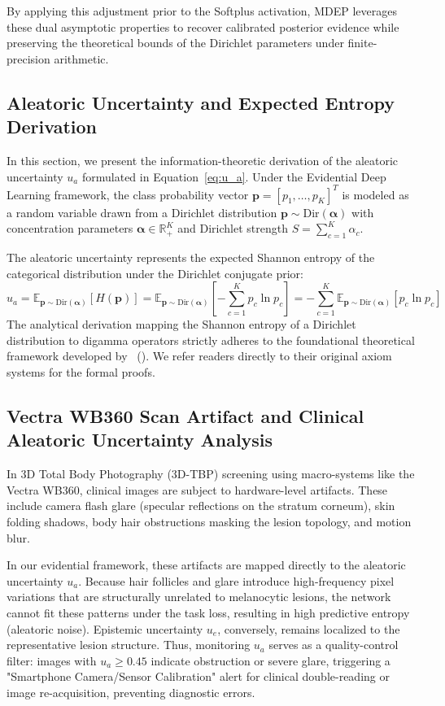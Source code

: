 \documentclass[letterpaper]{article} %
\begin{document}
By applying this adjustment prior to the Softplus activation, MDEP leverages these dual asymptotic properties to recover calibrated posterior evidence while preserving the theoretical bounds of the Dirichlet parameters under finite-precision arithmetic.

\subsection{Aleatoric Uncertainty and Expected Entropy Derivation}\label{subsec:aleatoric}
In this section, we present the information-theoretic derivation of the aleatoric uncertainty $u_a$ formulated in Equation~\ref{eq:u_a}. Under the Evidential Deep Learning framework, the class probability vector $\bm{p} = [p_1, \ldots, p_K]^T$ is modeled as a random variable drawn from a Dirichlet distribution $\bm{p} \sim \text{Dir}(\bm{\alpha})$ with concentration parameters $\bm{\alpha} \in \mathbb{R}_+^K$ and Dirichlet strength $S = \sum_{c=1}^K \alpha_c$.

The aleatoric uncertainty represents the expected Shannon entropy of the categorical distribution under the Dirichlet conjugate prior:
\begin{equation}
    u_a = \mathbb{E}_{\bm{p} \sim \text{Dir}(\bm{\alpha})}[H(\bm{p})] = \mathbb{E}_{\bm{p} \sim \text{Dir}(\bm{\alpha})}\left[ -\sum_{c=1}^K p_c \ln p_c \right] = -\sum_{c=1}^K \mathbb{E}_{\bm{p} \sim \text{Dir}(\bm{\alpha})}[p_c \ln p_c]
\end{equation}
The analytical derivation mapping the Shannon entropy of a Dirichlet distribution to digamma operators strictly adheres to the foundational theoretical framework developed by \citeauthor{malinin2018predictive}~(\citeyear{malinin2018predictive}). We refer readers directly to their original axiom systems for the formal proofs.

\subsection{Vectra WB360 Scan Artifact and Clinical Aleatoric Uncertainty Analysis}
In 3D Total Body Photography (3D-TBP) screening using macro-systems like the Vectra WB360, clinical images are subject to hardware-level artifacts. These include camera flash glare (specular reflections on the stratum corneum), skin folding shadows, body hair obstructions masking the lesion topology, and motion blur. 

In our evidential framework, these artifacts are mapped directly to the aleatoric uncertainty $u_a$. Because hair follicles and glare introduce high-frequency pixel variations that are structurally unrelated to melanocytic lesions, the network cannot fit these patterns under the task loss, resulting in high predictive entropy (aleatoric noise). Epistemic uncertainty $u_e$, conversely, remains localized to the representative lesion structure. Thus, monitoring $u_a$ serves as a quality-control filter: images with $u_a \ge 0.45$ indicate obstruction or severe glare, triggering a "Smartphone Camera/Sensor Calibration" alert for clinical double-reading or image re-acquisition, preventing diagnostic errors.
\end{document}
